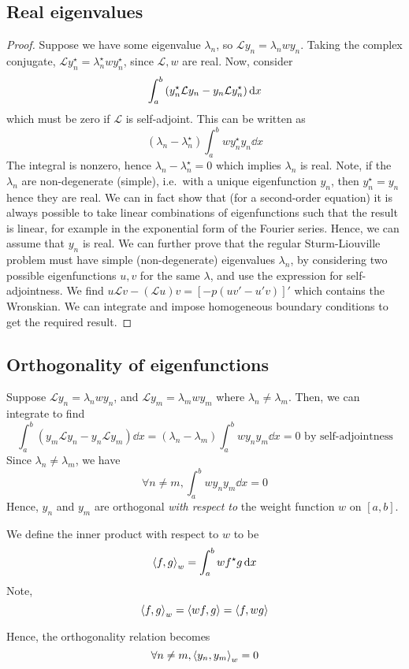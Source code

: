 \subsection{Real eigenvalues}
\begin{proof}
	Suppose we have some eigenvalue \( \lambda_n \), so \( \mathcal L y_n = \lambda_n w y_n \).
	Taking the complex conjugate, \( \mathcal L y_n^\star = \lambda_n^\star w y_n^\star \), since \( \mathcal L, w \) are real.
	Now, consider
	\[
		\int_a^b \qty(y_n^\star \mathcal L y_n - y_n \mathcal L y_n^\star) \dd{x}
	\]
	which must be zero if \( \mathcal L \) is self-adjoint.
	This can be written as
	\[
		(\lambda_n - \lambda_n^\star) \int_a^b w y_n^\star y_n \dd{x}
	\]
	The integral is nonzero, hence \( \lambda_n - \lambda_n^\star = 0 \) which implies \( \lambda_n \) is real.
	Note, if the \( \lambda_n \) are non-degenerate (simple), i.e.\ with a unique eigenfunction \( y_n \), then \( y_n^\star = y_n \) hence they are real.
	We can in fact show that (for a second-order equation) it is always possible to take linear combinations of eigenfunctions such that the result is linear, for example in the exponential form of the Fourier series.
	Hence, we can assume that \( y_n \) is real.
	We can further prove that the regular Sturm-Liouville problem must have simple (non-degenerate) eigenvalues \( \lambda_n \), by considering two possible eigenfunctions \( u, v \) for the same \( \lambda \), and use the expression for self-adjointness.
	We find \( u \mathcal L v - (\mathcal L u) v = [-p(uv' - u'v)]' \) which contains the Wronskian.
	We can integrate and impose homogeneous boundary conditions to get the required result.
\end{proof}

\subsection{Orthogonality of eigenfunctions}
Suppose \( \mathcal L y_n = \lambda_n w y_n \), and \( \mathcal L y_m = \lambda_m w y_m \) where \( \lambda_n \neq \lambda_m \).
Then, we can integrate to find
\[
	\int_a^b (y_m \mathcal L y_n - y_n \mathcal L y_m) \dd{x} = (\lambda_n - \lambda_m) \int_a^b w y_n y_m \dd{x} = 0 \text{ by self-adjointness}
\]
Since \( \lambda_n \neq \lambda_m \), we have
\[
	\forall n \neq m, \int_a^b w y_n y_m \dd{x} = 0
\]
Hence, \( y_n \) and \( y_m \) are orthogonal \textit{with respect to} the weight function \( w \) on \( [a,b] \).
\begin{definition}
	We define the inner product with respect to \( w \) to be
	\[
		\left\langle{f,g}\right\rangle_w = \int_a^b w f^\star g \dd{x}
	\]
	Note,
	\[
		\left\langle{f,g}\right\rangle_w = \left\langle{wf,g}\right\rangle = \left\langle{f,wg}\right\rangle
	\]
\end{definition}
Hence, the orthogonality relation becomes
\[
	\forall n \neq m, \left\langle{y_n, y_m}\right\rangle_w = 0
\]


